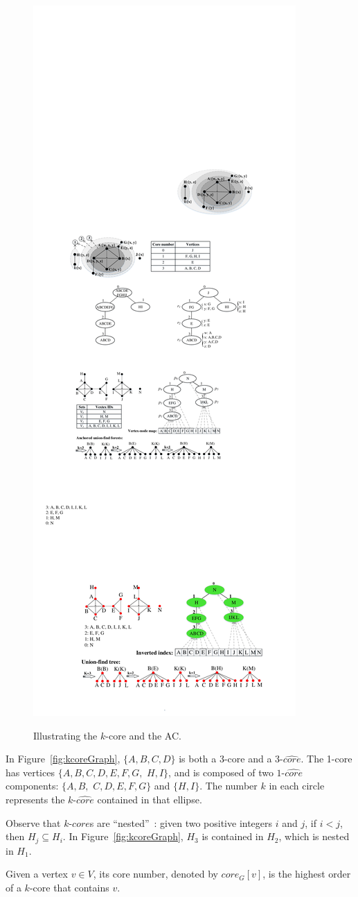 \begin{figure}[ht]
{{            \includegraphics[width=.40\columnwidth]{figures/kcoreTable}
            \label{fig:kcoreTable}
        }
    }
    \caption{Illustrating the $k$-core and the AC.}
\end{figure}

\begin{example}
\label{eg:problem}
In Figure~\ref{fig:kcoreGraph}, $\{A,B,C,D\}$ is both a 3-core and a 3-$\widehat{core}$. The 1-core has vertices $\{A,B,C,D,E,F,G,$ $H,I\}$, and is composed of two $1$-$\widehat{core}$ components: $\{A,B,$ $C,D,E,F,G\}$ and $\{H,I\}$. The number $k$ in each circle represents the $k$-$\widehat{core}$ contained in that ellipse.
\end{example}

Observe that $k$-$core$s are ``nested''~\cite{kcore2003}: given two positive integers $i$ and $j$, if $i<j$, then $H_j \subseteq H_i$.  In Figure~\ref{fig:kcoreGraph}, $H_3$ is contained in $H_2$, which is nested in $H_1$.

\begin{definition}
\label{def:coreNum}
Given a vertex $v \in V$, its core number, denoted by $core_G[v]$, is the highest order of a $k$-core that contains $v$.
\end{definition}

